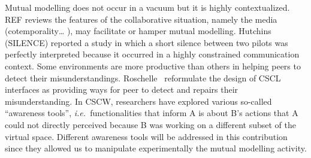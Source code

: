 \documentclass[twocolumn]{article}
\newcommand{\ie}{{\textit{i.e.\ }}}
\begin{document}
Mutual modelling does not occur in a vacuum but it is highly contextualized. REF
reviews the features of the collaborative situation, namely the media
(cotemporality… ), may facilitate or hamper mutual modelling. Hutchins (SILENCE)
reported a study in which a short silence between two pilots was perfectly
interpreted because it occurred in a highly constrained communication context.
Some environments are more productive than others in helping peers to detect
their misunderstandings. Roschelle~\citep{roschelle1995construction} reformulate
the design of CSCL interfaces as providing ways for peer to detect and repairs
their misunderstanding. In CSCW, researchers have explored various so-called
``awareness tools'', \ie functionalities that inform A is about B's actions that A
could not directly perceived because B was working on a different subset of the
virtual space. Different awareness tools will be addressed in this contribution
since they allowed us to manipulate experimentally the mutual modelling activity. 
\end{document}
